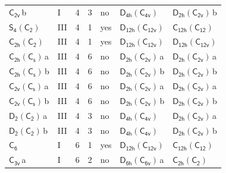 \documentclass[10pt,a4paper]{article}
\numberwithin{equation}{section}
\newcommand{\grp}[1]{\mathsf{#1}}
\newcommand{\clsletter}[1]{\,{\scriptsize\color{black!55}#1}}
\begin{document}
{\begin{longtable}{@{}llrrlll@{}}
\href{../../../rotation/data/pdf/C2v.pdf}{$\grp{C_{2v}}$}\clsletter{b} & I & 4 & 3 & no & \href{D4h-C4v.pdf}{$\grp{D_{4h}}(\grp{C_{4v}})$} & \href{D2h-C2v.pdf}{$\grp{D_{2h}}(\grp{C_{2v}})$}\clsletter{b}\\
\href{S4-C2.pdf}{$\grp{S_{4}}(\grp{C_{2}})$} & III & 4 & 1 & yes & \href{D12h-C12v.pdf}{$\grp{D_{12h}}(\grp{C_{12v}})$} & \href{C12h-C12.pdf}{$\grp{C_{12h}}(\grp{C_{12}})$}\\
\href{C2h-C2.pdf}{$\grp{C_{2h}}(\grp{C_{2}})$} & III & 4 & 1 & yes & \href{D12h-C12v.pdf}{$\grp{D_{12h}}(\grp{C_{12v}})$} & \href{D12h-C12v.pdf}{$\grp{D_{12h}}(\grp{C_{12v}})$}\\
\href{C2h-C1v.pdf}{$\grp{C_{2h}}(\grp{C_{s}})$}\clsletter{a} & III & 4 & 6 & no & \href{D2h-C2v.pdf}{$\grp{D_{2h}}(\grp{C_{2v}})$}\clsletter{a} & \href{D2h-C2v.pdf}{$\grp{D_{2h}}(\grp{C_{2v}})$}\clsletter{a}\\
\href{C2h-C1v.pdf}{$\grp{C_{2h}}(\grp{C_{s}})$}\clsletter{b} & III & 4 & 6 & no & \href{D2h-C2v.pdf}{$\grp{D_{2h}}(\grp{C_{2v}})$}\clsletter{b} & \href{D2h-C2v.pdf}{$\grp{D_{2h}}(\grp{C_{2v}})$}\clsletter{b}\\
\href{C2v-C1v.pdf}{$\grp{C_{2v}}(\grp{C_{s}})$}\clsletter{a} & III & 4 & 6 & no & \href{D2h-C2v.pdf}{$\grp{D_{2h}}(\grp{C_{2v}})$}\clsletter{a} & \href{D2h-C2v.pdf}{$\grp{D_{2h}}(\grp{C_{2v}})$}\clsletter{a}\\
\href{C2v-C1v.pdf}{$\grp{C_{2v}}(\grp{C_{s}})$}\clsletter{b} & III & 4 & 6 & no & \href{D2h-C2v.pdf}{$\grp{D_{2h}}(\grp{C_{2v}})$}\clsletter{b} & \href{D2h-C2v.pdf}{$\grp{D_{2h}}(\grp{C_{2v}})$}\clsletter{b}\\
\href{D2-C2.pdf}{$\grp{D_{2}}(\grp{C_{2}})$}\clsletter{a} & III & 4 & 3 & no & \href{D4h-C4v.pdf}{$\grp{D_{4h}}(\grp{C_{4v}})$} & \href{D2h-C2v.pdf}{$\grp{D_{2h}}(\grp{C_{2v}})$}\clsletter{a}\\
\href{D2-C2.pdf}{$\grp{D_{2}}(\grp{C_{2}})$}\clsletter{b} & III & 4 & 3 & no & \href{D4h-C4v.pdf}{$\grp{D_{4h}}(\grp{C_{4v}})$} & \href{D2h-C2v.pdf}{$\grp{D_{2h}}(\grp{C_{2v}})$}\clsletter{b}\\
\href{../../../rotation/data/pdf/C6.pdf}{$\grp{C_{6}}$} & I & 6 & 1 & yes & \href{D12h-C12v.pdf}{$\grp{D_{12h}}(\grp{C_{12v}})$} & \href{C12h-C12.pdf}{$\grp{C_{12h}}(\grp{C_{12}})$}\\
\href{../../../rotation/data/pdf/C3v.pdf}{$\grp{C_{3v}}$}\clsletter{a} & I & 6 & 2 & no & \href{D6h-C6v.pdf}{$\grp{D_{6h}}(\grp{C_{6v}})$}\clsletter{a} & \href{C2h-C2.pdf}{$\grp{C_{2h}}(\grp{C_{2}})$}\\

\end{longtable}}
\end{document}
